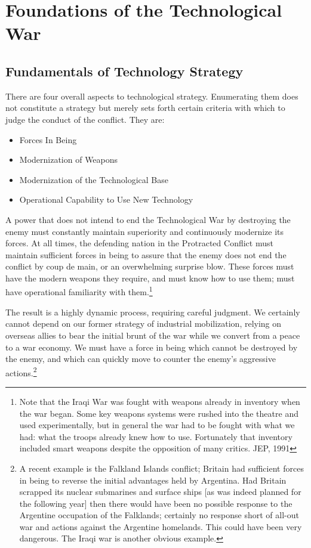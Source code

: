 \section{Foundations of the Technological War}
\subsection{Fundamentals of Technology Strategy}
There are four overall aspects to technological strategy. Enumerating them does not constitute a strategy but merely sets forth certain criteria with which to judge the conduct of the conflict. They are:
\begin{itemize}
    \item Forces In Being
    \item Modernization of Weapons
    \item Modernization of the Technological Base
    \item Operational Capability to Use New Technology
\end{itemize}

A power that does not intend to end the Technological War by destroying the enemy must constantly maintain superiority and continuously modernize its forces. At all times, the defending nation in the Protracted Conflict must maintain sufficient forces in being to assure that the enemy does not end the conflict by coup de main, or an overwhelming surprise blow. These forces must have the modern weapons they require, and must know how to use them; must have operational familiarity with them.\footnote{
Note that the Iraqi War was fought with weapons already in inventory when the war began. Some key weapons systems were rushed into the theatre and used experimentally, but in general the war had to be fought with what we had: what the troops already knew how to use. Fortunately that inventory included smart weapons despite the opposition of many critics. JEP, 1991}

The result is a highly dynamic process, requiring careful judgment. We certainly cannot depend on our former strategy of industrial mobilization, relying on overseas allies to bear the initial brunt of the war while we convert from a peace to a war economy. We must have a force in being which cannot be destroyed by the enemy, and which can quickly move to counter the enemy's aggressive actions.\footnote{
A recent example is the Falkland Islands conflict; Britain had sufficient forces in being to reverse the initial advantages held by Argentina. Had Britain scrapped its nuclear submarines and surface ships [as was indeed planned for the following year] then there would have been no possible response to the Argentine occupation of the Falklands; certainly no response short of all-out war and actions against the Argentine homelands. This could have been very dangerous. The Iraqi war is another obvious example.}

